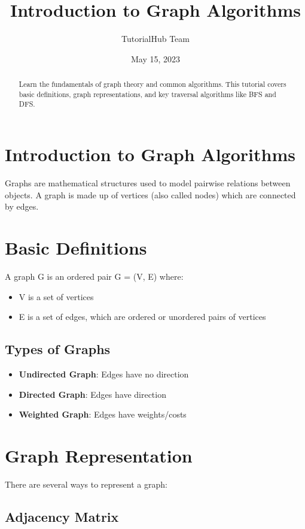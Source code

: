\documentclass{article}
\title{Introduction to Graph Algorithms}
\author{TutorialHub Team}
\date{May 15, 2023}
\begin{document}
\maketitle

\begin{abstract}
Learn the fundamentals of graph theory and common algorithms. This tutorial covers basic definitions, graph representations, and key traversal algorithms like BFS and DFS.
\end{abstract}

\section{Introduction to Graph Algorithms}

Graphs are mathematical structures used to model pairwise relations between objects. A graph is made up of vertices (also called nodes) which are connected by edges.

\section{Basic Definitions}

A graph G is an ordered pair G = (V, E) where:
\begin{itemize}
  \item V is a set of vertices
  \item E is a set of edges, which are ordered or unordered pairs of vertices
\end{itemize}

\subsection{Types of Graphs}

\begin{itemize}
  \item \textbf{Undirected Graph}: Edges have no direction
  \item \textbf{Directed Graph}: Edges have direction
  \item \textbf{Weighted Graph}: Edges have weights/costs
\end{itemize}

\section{Graph Representation}

There are several ways to represent a graph:

\subsection{Adjacency Matrix}
\end{document}
